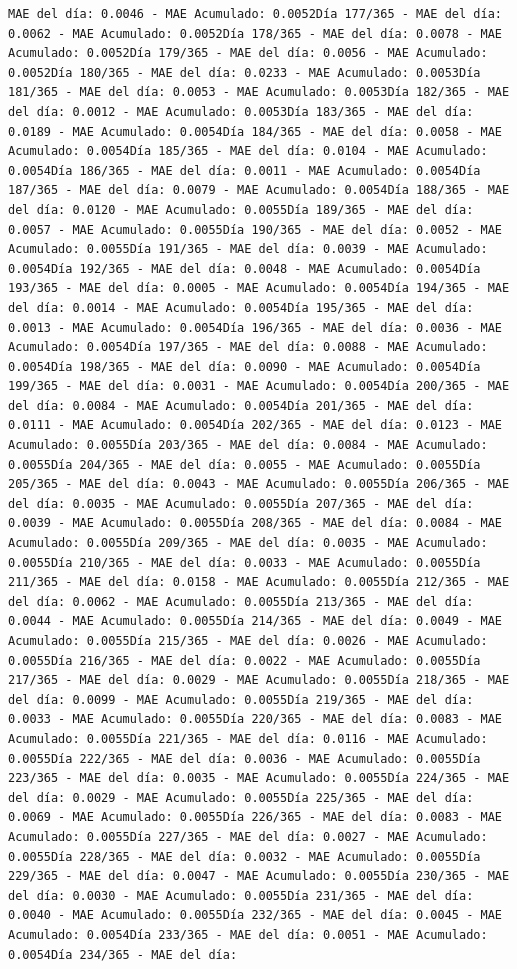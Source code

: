 \documentclass[
]{book}
\begin{document}
\begin{verbatim}
MAE del día: 0.0046 - MAE Acumulado: 0.0052Día 177/365 - MAE del día: 0.0062 - MAE Acumulado: 0.0052Día 178/365 - MAE del día: 0.0078 - MAE Acumulado: 0.0052Día 179/365 - MAE del día: 0.0056 - MAE Acumulado: 0.0052Día 180/365 - MAE del día: 0.0233 - MAE Acumulado: 0.0053Día 181/365 - MAE del día: 0.0053 - MAE Acumulado: 0.0053Día 182/365 - MAE del día: 0.0012 - MAE Acumulado: 0.0053Día 183/365 - MAE del día: 0.0189 - MAE Acumulado: 0.0054Día 184/365 - MAE del día: 0.0058 - MAE Acumulado: 0.0054Día 185/365 - MAE del día: 0.0104 - MAE Acumulado: 0.0054Día 186/365 - MAE del día: 0.0011 - MAE Acumulado: 0.0054Día 187/365 - MAE del día: 0.0079 - MAE Acumulado: 0.0054Día 188/365 - MAE del día: 0.0120 - MAE Acumulado: 0.0055Día 189/365 - MAE del día: 0.0057 - MAE Acumulado: 0.0055Día 190/365 - MAE del día: 0.0052 - MAE Acumulado: 0.0055Día 191/365 - MAE del día: 0.0039 - MAE Acumulado: 0.0054Día 192/365 - MAE del día: 0.0048 - MAE Acumulado: 0.0054Día 193/365 - MAE del día: 0.0005 - MAE Acumulado: 0.0054Día 194/365 - MAE del día: 0.0014 - MAE Acumulado: 0.0054Día 195/365 - MAE del día: 0.0013 - MAE Acumulado: 0.0054Día 196/365 - MAE del día: 0.0036 - MAE Acumulado: 0.0054Día 197/365 - MAE del día: 0.0088 - MAE Acumulado: 0.0054Día 198/365 - MAE del día: 0.0090 - MAE Acumulado: 0.0054Día 199/365 - MAE del día: 0.0031 - MAE Acumulado: 0.0054Día 200/365 - MAE del día: 0.0084 - MAE Acumulado: 0.0054Día 201/365 - MAE del día: 0.0111 - MAE Acumulado: 0.0054Día 202/365 - MAE del día: 0.0123 - MAE Acumulado: 0.0055Día 203/365 - MAE del día: 0.0084 - MAE Acumulado: 0.0055Día 204/365 - MAE del día: 0.0055 - MAE Acumulado: 0.0055Día 205/365 - MAE del día: 0.0043 - MAE Acumulado: 0.0055Día 206/365 - MAE del día: 0.0035 - MAE Acumulado: 0.0055Día 207/365 - MAE del día: 0.0039 - MAE Acumulado: 0.0055Día 208/365 - MAE del día: 0.0084 - MAE Acumulado: 0.0055Día 209/365 - MAE del día: 0.0035 - MAE Acumulado: 0.0055Día 210/365 - MAE del día: 0.0033 - MAE Acumulado: 0.0055Día 211/365 - MAE del día: 0.0158 - MAE Acumulado: 0.0055Día 212/365 - MAE del día: 0.0062 - MAE Acumulado: 0.0055Día 213/365 - MAE del día: 0.0044 - MAE Acumulado: 0.0055Día 214/365 - MAE del día: 0.0049 - MAE Acumulado: 0.0055Día 215/365 - MAE del día: 0.0026 - MAE Acumulado: 0.0055Día 216/365 - MAE del día: 0.0022 - MAE Acumulado: 0.0055Día 217/365 - MAE del día: 0.0029 - MAE Acumulado: 0.0055Día 218/365 - MAE del día: 0.0099 - MAE Acumulado: 0.0055Día 219/365 - MAE del día: 0.0033 - MAE Acumulado: 0.0055Día 220/365 - MAE del día: 0.0083 - MAE Acumulado: 0.0055Día 221/365 - MAE del día: 0.0116 - MAE Acumulado: 0.0055Día 222/365 - MAE del día: 0.0036 - MAE Acumulado: 0.0055Día 223/365 - MAE del día: 0.0035 - MAE Acumulado: 0.0055Día 224/365 - MAE del día: 0.0029 - MAE Acumulado: 0.0055Día 225/365 - MAE del día: 0.0069 - MAE Acumulado: 0.0055Día 226/365 - MAE del día: 0.0083 - MAE Acumulado: 0.0055Día 227/365 - MAE del día: 0.0027 - MAE Acumulado: 0.0055Día 228/365 - MAE del día: 0.0032 - MAE Acumulado: 0.0055Día 229/365 - MAE del día: 0.0047 - MAE Acumulado: 0.0055Día 230/365 - MAE del día: 0.0030 - MAE Acumulado: 0.0055Día 231/365 - MAE del día: 0.0040 - MAE Acumulado: 0.0055Día 232/365 - MAE del día: 0.0045 - MAE Acumulado: 0.0054Día 233/365 - MAE del día: 0.0051 - MAE Acumulado: 0.0054Día 234/365 - MAE del día: 
\end{verbatim}
\end{document}
